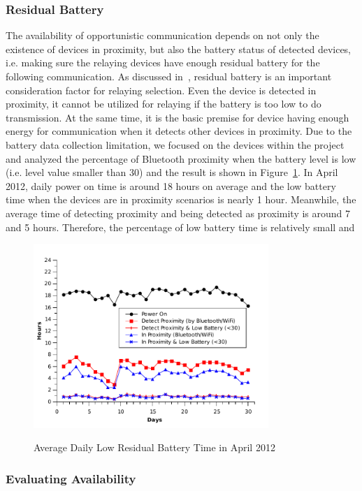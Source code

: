 \subsubsection*{Residual Battery}
The availability of opportunistic communication depends on not only the existence of devices in proximity, but also the battery status of detected devices, i.e. making sure the relaying devices have enough residual battery for the following communication. As discussed in~\cite{zou2012exploiting, madan2008energy}, residual battery is an important consideration factor for relaying selection. Even the device is detected in proximity, it cannot be utilized for relaying if the battery is too low to do transmission. At the same time, it is the basic premise for device having enough energy for communication when it detects other devices in proximity. 
Due to the battery data collection limitation, we focused on the devices within the project and analyzed the percentage of Bluetooth proximity when the battery level is low (i.e. level value smaller than 30) and the result is shown in Figure~\ref{fig:battery}. In April 2012, daily power on time is around 18 hours on average and the low battery time when the devices are in proximity scenarios is nearly 1 hour. Meanwhile, the average time of detecting proximity and being detected as proximity is around 7 and 5 hours. Therefore, the percentage of low battery time is relatively small and 

\begin{figure}[tbp]
\centering 
{\includegraphics[width=3.5in]{graphs/battery.pdf}}
\caption{Average Daily Low Residual Battery Time in April 2012} 
\label{fig:battery}
\end{figure} 

\subsubsection*{Evaluating Availability} 

